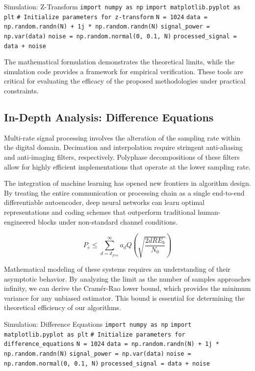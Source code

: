 \begin{pythonbox}{Simulation: Z-Transform}
\texttt{import numpy as np}
\texttt{import matplotlib.pyplot as plt}
\texttt{}
\texttt{\# Initialize parameters for z-transform}
\texttt{N = 1024}
\texttt{data = np.random.randn(N) + 1j * np.random.randn(N)}
\texttt{signal\_power = np.var(data)}
\texttt{noise = np.random.normal(0, 0.1, N)}
\texttt{processed\_signal = data + noise}
\end{pythonbox}

\vspace{0.5cm}
The mathematical formulation demonstrates the theoretical limits, while the simulation code provides a framework for empirical verification. These tools are critical for evaluating the efficacy of the proposed methodologies under practical constraints.


\subsection{In-Depth Analysis: Difference Equations}
Multi-rate signal processing involves the alteration of the sampling rate within the digital domain. Decimation and interpolation require stringent anti-aliasing and anti-imaging filters, respectively. Polyphase decompositions of these filters allow for highly efficient implementations that operate at the lower sampling rate.

The integration of machine learning has opened new frontiers in algorithm design. By treating the entire communication or processing chain as a single end-to-end differentiable autoencoder, deep neural networks can learn optimal representations and coding schemes that outperform traditional human-engineered blocks under non-standard channel conditions.

\begin{equation}
    P_e \leq \sum_{d=d_{free}}^{\infty} a_d Q\left(\sqrt{\frac{2 d R E_b}{N_0}}\right)
\end{equation}

Mathematical modeling of these systems requires an understanding of their asymptotic behavior. By analyzing the limit as the number of samples approaches infinity, we can derive the Cramér-Rao lower bound, which provides the minimum variance for any unbiased estimator. This bound is essential for determining the theoretical efficiency of our algorithms.

\begin{pythonbox}{Simulation: Difference Equations}
\texttt{import numpy as np}
\texttt{import matplotlib.pyplot as plt}
\texttt{}
\texttt{\# Initialize parameters for difference\_equations}
\texttt{N = 1024}
\texttt{data = np.random.randn(N) + 1j * np.random.randn(N)}
\texttt{signal\_power = np.var(data)}
\texttt{noise = np.random.normal(0, 0.1, N)}
\texttt{processed\_signal = data + noise}
\end{pythonbox}

